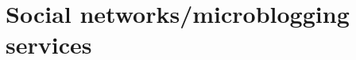 

\lipsum[1]

\section{Social networks/microblogging services}
\label{s:background-socialnetworks}


\lipsum[1]
